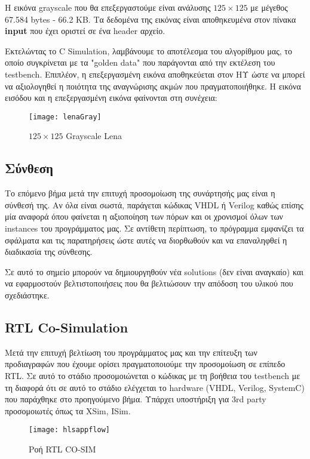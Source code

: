 Η εικόνα grayscale που θα επεξεργαστούμε είναι ανάλυσης $125\times 125$ με μέγεθος 67.584 bytes - 66.2 KB. Τα δεδομένα της εικόνας είναι αποθηκευμένα στον πίνακα \textbf{input} που έχει οριστεί σε ένα header αρχείο.

Εκτελώντας το C Simulation, λαμβάνουμε το αποτέλεσμα του αλγορίθμου μας, το οποίο συγκρίνεται με τα "golden data" που παράγονται από την εκτέλεση του testbench. Επιπλέον, η επεξεργασμένη εικόνα αποθηκεύεται στον ΗΥ ώστε να μπορεί να αξιολογηθεί η ποιότητα της αναγνώρισης ακμών που πραγματοποιήθηκε. Η εικόνα εισόδου και η επεξεργασμένη εικόνα φαίνονται στη συνέχεια:
\begin{figure}[H]
   \centering
   \texttt{[image: lenaGray]}\\
   \caption{$125\times 125$ Grayscale Lena}
\end{figure}
\subsection{Σύνθεση}

Το επόμενο βήμα μετά την επιτυχή προσομοίωση της συνάρτησής μας είναι η σύνθεσή της. Αν όλα είναι σωστά, παράγεται κώδικας VHDL ή Verilog καθώς επίσης μία αναφορά όπου φαίνεται η αξιοποίηση των πόρων και οι χρονισμοί όλων των instances του προγράμματος μας. Σε αντίθετη περίπτωση, το πρόγραμμα εμφανίζει τα σφάλματα και τις παρατηρήσεις ώστε αυτές να διορθωθούν και να επαναληφθεί η διαδικασία της σύνθεσης.

Σε αυτό το σημείο μπορούν να δημιουργηθούν νέα solutions (δεν είναι αναγκαίο) και να εφαρμοστούν βελτιστοποιήσεις που θα βελτιώσουν την απόδοση του υλικού που σχεδιάστηκε.

\subsection{RTL Co-Simulation}

Μετά την επιτυχή βελτίωση του προγράμματος μας και την επίτευξη των προδιαγραφών που έχουμε ορίσει πραγματοποιούμε την προσομοίωση σε επίπεδο RTL. Σε αυτό το στάδιο προσομοιώνεται ο κώδικας με τη βοήθεια του testbench με τη διαφορά ότι σε αυτό το στάδιο ελέγχεται το hardware (VHDL, Verilog, SystemC) που παράχθηκε στο προηγούμενο βήμα. Υπάρχει υποστήριξη για 3rd party προσομοιωτές όπως τα XSim, ISim.
\begin{figure}[H]
   \centering
   \texttt{[image: hlsappflow]}\\
   \caption{Ροή RTL CO-SIM \cite{ug902}}
\end{figure}


